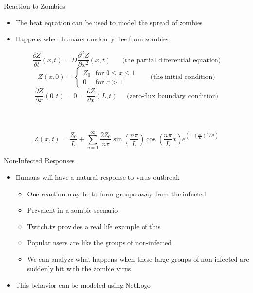 \documentclass{beamer}
\begin{document}
\begin{frame}{Reaction to Zombies}
\begin{itemize}
\item The heat equation can be used to model the spread of zombies
\pause
\item Happens when humans randomly flee from zombies
\end{itemize}
\[
\frac{\partial Z}{\partial t} (x,t) =
D \frac{\partial^2 Z}{\partial x^2} (x,t) \;\;\;\;\;\; \text{(the partial differential equation)}
\]
\pause
\[
Z(x,0) = \begin{cases}
Z_0 & \text{for $0 \leq x \leq 1$}\\
0 & \text{for $x > 1$}
\end{cases} \;\;\;\;\;\;\ \text{(the initial condition)}
\]
\pause
\[
\frac{\partial Z}{\partial x} (0,t) = 0 =
\frac{\partial Z}{\partial x} (L,t) \;\;\;\;\; \text{(zero-flux boundary condition)}
\]
\noindent\\
\noindent\\
\noindent\\
\pause
\[
Z(x,t) = \frac{Z_0}{L} + \sum_{n=1}^{\infty}
\frac{2Z_0}{n \pi}\sin\left(\frac{n \pi}{L}\right)
\cos\left(\frac{n \pi}{L} x\right) e^{\left(-\left(\frac{n \pi}{L}\right)^2 Dt\right)}
\]
\end{frame}

\begin{frame}{Non-Infected Responses}
\begin{itemize}
\item Humans will have a natural response to virus outbreak
\pause
\begin{itemize}
\item One reaction may be to form groups away from the infected
\pause
\item Prevalent in a zombie scenario
\pause
\item Twitch.tv provides a real life example of this
\pause
\item Popular users are like the groups of non-infected
\pause
\item We can analyze what happens when these large groups of non-infected are suddenly hit with the
zombie virus
\end{itemize}
\pause
\item This behavior can be modeled using NetLogo
\end{itemize}
\end{frame}
\end{document}
